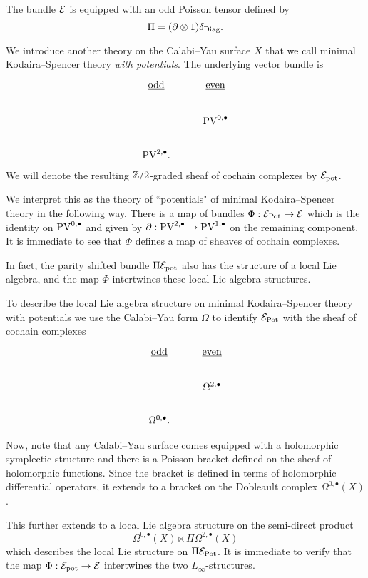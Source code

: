 \documentclass[11pt]{article}
\newcommand\bu{\bullet}
\begin{document}
The bundle $\mathcal{E}$ is equipped with an odd Poisson tensor defined by 
\[
\Pi = (\partial \otimes 1) \delta_{\rm Diag} .
\]

We introduce another theory on the Calabi--Yau surface $X$ that we call minimal Kodaira--Spencer theory {\em with potentials}.
The underlying vector bundle is 
\[
\begin{tikzcd}
\ul{\rm odd} & \ul{\rm even} \\
 & \PV^{0,\bu} \\
 \PV^{2,\bu}  .
\end{tikzcd}
\]
We will denote the resulting $\mathbb{Z}/2$-graded sheaf of cochain complexes by $\mathcal{E}_{\rm pot}$. 

We interpret this as the theory of  ``potentials"  of minimal Kodaira--Spencer theory in the following way. 
There is a map of bundles $\Phi : \mathcal{E}_{\rm Pot} \to \mathcal{E}$ which is the identity on $\PV^{0,\bu}$ and given by $\partial : \PV^{2,\bu} \to \PV^{1,\bu}$ on the remaining component. 
It is immediate to see that $\Phi$ defines a map of sheaves of cochain complexes. 

In fact, the parity shifted bundle $\Pi \mathcal{E}_{\rm pot}$ also has the structure of a local Lie algebra, and the map $\Phi$ intertwines these local Lie algebra structures. 

To describe the local Lie algebra structure on minimal Kodaira--Spencer theory with potentials we use the Calabi--Yau form $\Omega$ to identify $\mathcal{E}_{\rm Pot}$ with the sheaf of cochain complexes
\[
\begin{tikzcd}
\ul{\rm odd} & \ul{\rm even} \\
 & \Omega^{2,\bu} \\
 \Omega^{0,\bu}  .
\end{tikzcd}
\]

Now, note that any Calabi--Yau surface comes equipped with a holomorphic symplectic structure and there is a Poisson bracket defined on the sheaf of holomorphic functions.
Since the bracket is defined in terms of holomorphic differential operators, it extends to a bracket on the Dobleault complex $\Omega^{0,\bu}(X)$.

This further extends to a local Lie algebra structure on the semi-direct product 
\[
\Omega^{0,\bu}(X) \ltimes \Pi \Omega^{2,\bu}(X)
\]
which describes the local Lie structure on $\Pi \mathcal{E}_{\rm Pot}$. 
It is immediate to verify that the map $\Phi : \mathcal{E}_{\rm pot} \to \mathcal{E}$ intertwines the two $L_\infty$-structures. 

%
\end{document}
